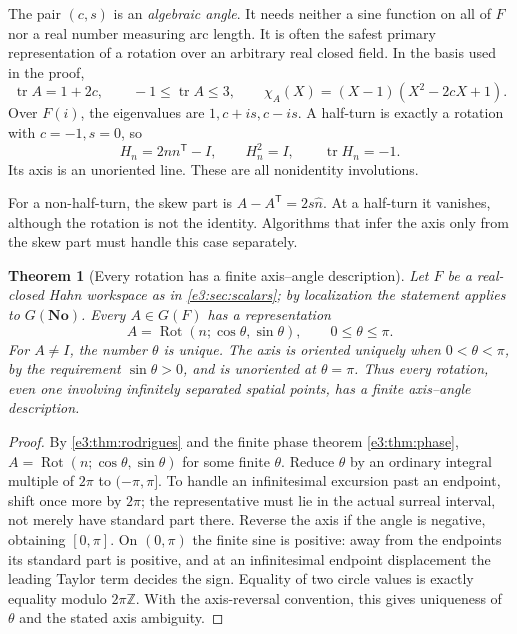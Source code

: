 \documentclass[11pt,letterpaper]{article}
\numberwithin{equation}{section}
\newtheorem{theorem}{Theorem}[section]
\theoremstyle{definition}
\theoremstyle{remark}
\newcommand{\No}{\mathbf{No}}
\newcommand{\Z}{\mathbb Z}
\newcommand{\Rot}{\operatorname{Rot}}
\newcommand{\tr}{\operatorname{tr}}
\newcommand{\transpose}{^{\mathsf T}}
\begin{document}
The pair $(c,s)$ is an \emph{algebraic angle}. It needs neither a sine function
on all of $F$ nor a real number measuring arc length. It is often the safest
primary representation of a rotation over an arbitrary real closed field.
In the basis used in the proof,
\begin{equation}\label{e3:so:eq:trace}
 \tr A=1+2c,\qquad -1\le\tr A\le3,
 \qquad \chi_A(X)=(X-1)(X^2-2cX+1).
\end{equation}
Over $F(i)$, the eigenvalues are $1,c+is,c-is$. A half-turn is exactly a
rotation with $c=-1,s=0$, so
\begin{equation}\label{e3:so:eq:halfturn}
 H_n=2nn\transpose-I,\qquad H_n^2=I,\qquad \tr H_n=-1.
\end{equation}
Its axis is an unoriented line. These are all nonidentity involutions.

For a non-half-turn, the skew part is
$A-A\transpose=2s\widehat n$. At a half-turn it vanishes, although the rotation is
not the identity. Algorithms that infer the axis only from the skew part must
handle this case separately.

\begin{theorem}[Every rotation has a finite axis--angle description]\label{e3:thm:finiteaxis}
Let $F$ be a real-closed Hahn workspace as in \cref{e3:sec:scalars}; by
localization the statement applies to $G(\No)$. Every $A\in G(F)$ has a
representation
\[
 A=\Rot(n;\cos\theta,\sin\theta),\qquad 0\le\theta\le\pi .
\]
For $A\ne I$, the number $\theta$ is unique. The axis is oriented uniquely when
$0<\theta<\pi$, by the requirement $\sin\theta>0$, and is unoriented at
$\theta=\pi$. Thus every rotation, even one involving infinitely separated
spatial points, has a finite axis--angle description.
\end{theorem}
\begin{proof}
By \cref{e3:thm:rodrigues} and the finite phase theorem \cref{e3:thm:phase},
$A=\Rot(n;\cos\theta,\sin\theta)$ for some finite $\theta$. Reduce $\theta$ by
an ordinary integral multiple of $2\pi$ to $(-\pi,\pi]$. To handle an
infinitesimal excursion past an endpoint, shift once more by $2\pi$; the
representative must lie in the actual surreal interval, not merely have
standard part there. Reverse the axis if the angle is negative, obtaining
$[0,\pi]$. On $(0,\pi)$ the finite sine is positive: away from the endpoints its
standard part is positive, and at an infinitesimal endpoint displacement the
leading Taylor term decides the sign. Equality of two circle values is exactly
equality modulo $2\pi\Z$. With the axis-reversal convention, this gives
uniqueness of $\theta$ and the stated axis ambiguity.
\end{proof}
\end{document}
